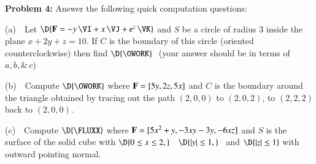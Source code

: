 \documentclass[11pt]{article}
\begin{document}
{\bf Problem 4:}  Answer the following quick computation questions:

(a) \,\, Let $\D{{\bf F} = -y\,\VI + x\, \VJ + e^z\, \VK}$ and $S$ be a circle of radius 3 inside the plane $x+2y+z=10$.  If $C$ is the boundary of this circle (oriented counterclockwise) then find $\D{\OWORK}$ \,\,(your answer should be in terms of $a,b, \& \, c$)

\vspace{8.0cm}

(b) \,\, Compute $\D{\OWORK}$ where ${\bf F} = [5y ,2z ,5x]$ and $C$ is the boundary around the triangle obtained by tracing out the path $(2,0,0)$ to $(2,0,2)$, to $(2,2,2)$ back to $(2,0,0)$. 

\vspace{7.8cm}

(c) \,\, Compute $\D{\FLUXX}$ where ${\bf F} = [5x^2+y ,-3xy-3y,-6xz]$ and $S$ is the surface of the solid cube with $\D{0 \le x \le 2,}$ \, $\D{ |y| \le 1,}$ \, and $\D{|z| \le 1}$ with outward pointing normal.

\end{document}
